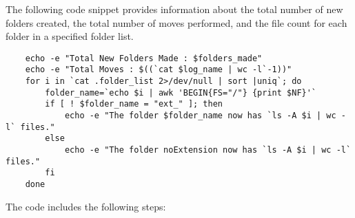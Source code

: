 \documentclass[12pt]{article}
\begin{document}
    The following code snippet provides information about the total number of new folders created, the total number of moves performed, and the file count for each folder in a specified folder list.
    
    \begin{verbatim}
    echo -e "Total New Folders Made : $folders_made"
    echo -e "Total Moves : $((`cat $log_name | wc -l`-1))"
    for i in `cat .folder_list 2>/dev/null | sort |uniq`; do
        folder_name=`echo $i | awk 'BEGIN{FS="/"} {print $NF}'`
        if [ ! $folder_name = "ext_" ]; then
            echo -e "The folder $folder_name now has `ls -A $i | wc -l` files."
        else
            echo -e "The folder noExtension now has `ls -A $i | wc -l` files."
        fi
    done
    \end{verbatim}
    
    The code includes the following steps:
    
\end{document}
